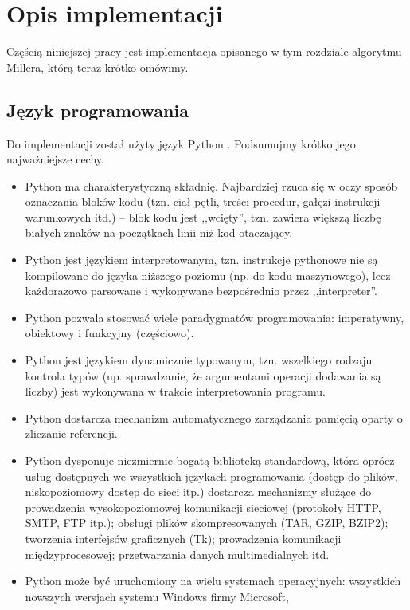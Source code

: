 \section{Opis implementacji}

\noindent
Częścią niniejszej pracy jest implementacja
opisanego w tym rozdziale algorytmu Millera,
którą teraz krótko omówimy.

\subsection*{Język programowania}

\noindent
Do implementacji został użyty język Python \cite{python}.
Podsumujmy krótko jego najważniejsze cechy.
\begin{itemize}
\item
Python ma charakterystyczną składnię.
Najbardziej rzuca się w oczy sposób oznaczania bloków kodu
(tzn. ciał pętli, treści procedur, gałęzi instrukcji warunkowych itd.) --
blok kodu jest ,,wcięty'',
tzn. zawiera większą liczbę białych znaków na początkach linii
niż kod otaczający.
\item
Python jest językiem interpretowanym,
tzn. instrukcje pythonowe nie są kompilowane do języka niższego poziomu
(np. do kodu maszynowego),
lecz każdorazowo parsowane i wykonywane bezpośrednio przez ,,interpreter''.
\item
Python pozwala stosować wiele paradygmatów programowania:
imperatywny, obiektowy i funkcyjny (częściowo).
\item
Python jest językiem dynamicznie typowanym,
tzn. wszelkiego rodzaju kontrola typów
(np. sprawdzanie, że argumentami operacji dodawania są liczby)
jest wykonywana w trakcie interpretowania programu.
\item
Python dostarcza mechanizm automatycznego zarządzania pamięcią
oparty o zliczanie referencji.
\item
Python dysponuje niezmiernie bogatą biblioteką standardową,
która oprócz usług dostępnych we wszystkich językach programowania
(dostęp do plików, niskopoziomowy dostęp do sieci itp.)
dostarcza mechanizmy służące
do prowadzenia wysokopoziomowej komunikacji sieciowej
(protokoły HTTP, SMTP, FTP itp.);
obsługi plików skompresowanych (TAR, GZIP, BZIP2);
tworzenia interfejsów graficznych (Tk);
prowadzenia komunikacji międzyprocesowej;
przetwarzania danych multimedialnych itd.
\item
Python może być uruchomiony na wielu systemach operacyjnych:
wszystkich nowszych wersjach systemu Windows firmy Microsoft,

\end{itemize}
